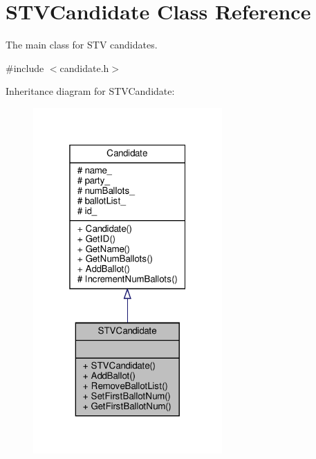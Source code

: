 \hypertarget{classSTVCandidate}{}\section{S\+T\+V\+Candidate Class Reference}
\label{classSTVCandidate}


The main class for S\+TV candidates.  




{\ttfamily \#include $<$candidate.\+h$>$}



Inheritance diagram for S\+T\+V\+Candidate\+:
\nopagebreak
\begin{figure}[H]
\begin{center}
\leavevmode
\includegraphics[width=205pt]{classSTVCandidate__inherit__graph}
\end{center}
\end{figure}


